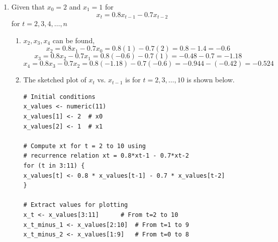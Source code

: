 \documentclass[12pt]{article}
\begin{document}
\begin{enumerate}
    \item Given that $x_0 = 2$ and $x_1 = 1$ for
    \[ x_t = 0.8x_{t-1} - 0.7x_{t-2} \]
    for $t = 2, 3, 4, \ldots, n$
    \begin{enumerate}
        \item $x_2, x_3, x_4$ can be found,
        \[ 
        x_2 = 0.8x_1 - 0.7x_0 = 0.8(1) - 0.7(2) 
        = 0.8 - 1.4 = -0.6
        \]
        \[
        x_3 = 0.8x_2 - 0.7x_1 = 0.8(-0.6) - 0.7(1)
        = -0.48 - 0.7 = -1.18
        \]
        \[
        x_4 = 0.8x_3 - 0.7x_2 = 0.8(-1.18) - 0.7(-0.6)
        = -0.944 - (-0.42) = -0.524
        \]
        \item The sketched plot of $x_t$ vs. $x_{t-1}$ is
        for $t = 2, 3, \ldots, 10$ is shown below.
\begin{verbatim}
# Initial conditions
x_values <- numeric(11)
x_values[1] <- 2  # x0
x_values[2] <- 1  # x1

# Compute xt for t = 2 to 10 using 
# recurrence relation xt = 0.8*xt-1 - 0.7*xt-2
for (t in 3:11) {
x_values[t] <- 0.8 * x_values[t-1] - 0.7 * x_values[t-2]
}

# Extract values for plotting
x_t <- x_values[3:11]      # From t=2 to 10
x_t_minus_1 <- x_values[2:10]  # From t=1 to 9
x_t_minus_2 <- x_values[1:9]   # From t=0 to 8


\end{verbatim}
\end{enumerate}
\end{enumerate}
\end{document}
